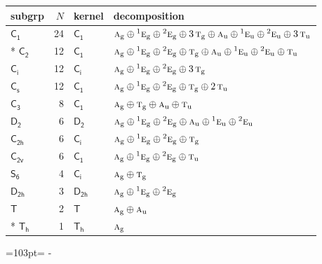 \documentclass[10pt,a4paper]{article}
\newcommand{\needspace}[1]{\par\penalty-100\begingroup\dimen0=#1\relax\dimen2=\pagegoal
  \advance\dimen2-\pagetotal\ifdim\dimen0>\dimen2\relax\ifdim\dimen2>0pt\vfil\break\fi\fi
  \endgroup}
\numberwithin{equation}{section}
\newcommand{\grp}[1]{\mathsf{#1}}
\newcommand{\irr}[1]{\text{\normalfont\scshape #1}}
\newcommand{\conjpair}[1]{{}^{#1}}
\newcommand{\ptag}[1]{\mathrm{#1}}
\newlength{\fillwidth}\newlength{\cellwidth}\newlength{\colwidth}
\begin{document}
{\begin{longtable}{@{}lrl>{\RaggedRight\arraybackslash}p{\fillwidth}@{}}
subgrp & $N$ & kernel & decomposition\\\midrule\endhead
\bottomrule\endfoot\endlastfoot
\href{C1.pdf}{$\grp{C_{1}}$} & 24 & \href{C1.pdf}{$\grp{C_{1}}$} & $\irr{a}_{\ptag{g}}\oplus \conjpair{1}\irr{e}_{\ptag{g}}\oplus \conjpair{2}\irr{e}_{\ptag{g}}\oplus 3\,\irr{t}_{\ptag{g}}\oplus \irr{a}_{\ptag{u}}\oplus \conjpair{1}\irr{e}_{\ptag{u}}\oplus \conjpair{2}\irr{e}_{\ptag{u}}\oplus 3\,\irr{t}_{\ptag{u}}$\\*
\href{C2.pdf}{$\grp{C_{2}}$} & 12 & \href{C1.pdf}{$\grp{C_{1}}$} & $\irr{a}_{\ptag{g}}\oplus \conjpair{1}\irr{e}_{\ptag{g}}\oplus \conjpair{2}\irr{e}_{\ptag{g}}\oplus \irr{t}_{\ptag{g}}\oplus \irr{a}_{\ptag{u}}\oplus \conjpair{1}\irr{e}_{\ptag{u}}\oplus \conjpair{2}\irr{e}_{\ptag{u}}\oplus \irr{t}_{\ptag{u}}$\\
\href{S2.pdf}{$\grp{C_{i}}$} & 12 & \href{S2.pdf}{$\grp{C_{i}}$} & $\irr{a}_{\ptag{g}}\oplus \conjpair{1}\irr{e}_{\ptag{g}}\oplus \conjpair{2}\irr{e}_{\ptag{g}}\oplus 3\,\irr{t}_{\ptag{g}}$\\
\href{C1v.pdf}{$\grp{C_{s}}$} & 12 & \href{C1.pdf}{$\grp{C_{1}}$} & $\irr{a}_{\ptag{g}}\oplus \conjpair{1}\irr{e}_{\ptag{g}}\oplus \conjpair{2}\irr{e}_{\ptag{g}}\oplus \irr{t}_{\ptag{g}}\oplus 2\,\irr{t}_{\ptag{u}}$\\
\href{C3.pdf}{$\grp{C_{3}}$} & 8 & \href{C1.pdf}{$\grp{C_{1}}$} & $\irr{a}_{\ptag{g}}\oplus \irr{t}_{\ptag{g}}\oplus \irr{a}_{\ptag{u}}\oplus \irr{t}_{\ptag{u}}$\\
\href{D2.pdf}{$\grp{D_{2}}$} & 6 & \href{D2.pdf}{$\grp{D_{2}}$} & $\irr{a}_{\ptag{g}}\oplus \conjpair{1}\irr{e}_{\ptag{g}}\oplus \conjpair{2}\irr{e}_{\ptag{g}}\oplus \irr{a}_{\ptag{u}}\oplus \conjpair{1}\irr{e}_{\ptag{u}}\oplus \conjpair{2}\irr{e}_{\ptag{u}}$\\
\href{C2h.pdf}{$\grp{C_{2h}}$} & 6 & \href{S2.pdf}{$\grp{C_{i}}$} & $\irr{a}_{\ptag{g}}\oplus \conjpair{1}\irr{e}_{\ptag{g}}\oplus \conjpair{2}\irr{e}_{\ptag{g}}\oplus \irr{t}_{\ptag{g}}$\\
\href{C2v.pdf}{$\grp{C_{2v}}$} & 6 & \href{C1.pdf}{$\grp{C_{1}}$} & $\irr{a}_{\ptag{g}}\oplus \conjpair{1}\irr{e}_{\ptag{g}}\oplus \conjpair{2}\irr{e}_{\ptag{g}}\oplus \irr{t}_{\ptag{u}}$\\
\href{S6.pdf}{$\grp{S_{6}}$} & 4 & \href{S2.pdf}{$\grp{C_{i}}$} & $\irr{a}_{\ptag{g}}\oplus \irr{t}_{\ptag{g}}$\\
\href{D2h.pdf}{$\grp{D_{2h}}$} & 3 & \href{D2h.pdf}{$\grp{D_{2h}}$} & $\irr{a}_{\ptag{g}}\oplus \conjpair{1}\irr{e}_{\ptag{g}}\oplus \conjpair{2}\irr{e}_{\ptag{g}}$\\
\href{T.pdf}{$\grp{T}$} & 2 & \href{T.pdf}{$\grp{T}$} & $\irr{a}_{\ptag{g}}\oplus \irr{a}_{\ptag{u}}$\\*
\href{Th.pdf}{$\grp{T_{h}}$} & 1 & \href{Th.pdf}{$\grp{T_{h}}$} & $\irr{a}_{\ptag{g}}$\\
\bottomrule\end{longtable}}
\needspace{103pt}
\end{document}
